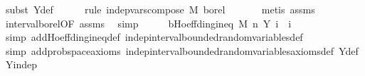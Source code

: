 \begin{isabellebody}
\ {\isacharparenleft}{\kern0pt}subst\ Y{\isacharunderscore}{\kern0pt}def{\isacharparenright}{\kern0pt}\isanewline
\ \ \ \ \isamarkupfalse%
\ {\isacharparenleft}{\kern0pt}rule\ indep{\isacharunderscore}{\kern0pt}vars{\isacharunderscore}{\kern0pt}compose{\isacharbrackleft}{\kern0pt}\ M{\isacharprime}{\kern0pt}{\isacharequal}{\kern0pt}{\isachardoublequoteopen}{\isacharparenleft}{\kern0pt}{\isasymlambda}{\isacharunderscore}{\kern0pt}{\isachardot}{\kern0pt}\ borel{\isacharparenright}{\kern0pt}{\isachardoublequoteclose}{\isacharbrackright}{\kern0pt}{\isacharparenright}{\kern0pt}\isanewline
\ \ \ \ \ \isamarkupfalse%
\ {\isacharparenleft}{\kern0pt}metis\ assms{\isacharparenleft}{\kern0pt}{}{\isacharparenright}{\kern0pt}{\isacharparenright}{\kern0pt}\isanewline
\ \ \ \ \isamarkupfalse%
\ interval{\isacharunderscore}{\kern0pt}borel{\isacharbrackleft}{\kern0pt}OF\ assms{\isacharparenleft}{\kern0pt}{}{\isacharparenright}{\kern0pt}{\isacharbrackright}{\kern0pt}\ \isamarkupfalse%
\ simp\isanewline
\ \isanewline
\ \ \isamarkupfalse%
\ b{\isacharcolon}{\kern0pt}{\isachardoublequoteopen}Hoeffding{\isacharunderscore}{\kern0pt}ineq\ M\ {\isacharbraceleft}{\kern0pt}{}{\isachardot}{\kern0pt}{\isachardot}{\kern0pt}{\isacharless}{\kern0pt}n{\isacharbraceright}{\kern0pt}\ Y\ {\isacharparenleft}{\kern0pt}{\isasymlambda}i{\isachardot}{\kern0pt}\ {}{\isacharparenright}{\kern0pt}\ {\isacharparenleft}{\kern0pt}{\isasymlambda}i{\isachardot}{\kern0pt}\ {}{\isacharparenright}{\kern0pt}{\isachardoublequoteclose}\ \isanewline
\ \ \ \ \isamarkupfalse%
\ {\isacharparenleft}{\kern0pt}simp\ add{\isacharcolon}{\kern0pt}Hoeffding{\isacharunderscore}{\kern0pt}ineq{\isacharunderscore}{\kern0pt}def\ indep{\isacharunderscore}{\kern0pt}interval{\isacharunderscore}{\kern0pt}bounded{\isacharunderscore}{\kern0pt}random{\isacharunderscore}{\kern0pt}variables{\isacharunderscore}{\kern0pt}def{\isacharparenright}{\kern0pt}\isanewline
\ \ \ \ \isamarkupfalse%
\ {\isacharparenleft}{\kern0pt}simp\ add{\isacharcolon}{\kern0pt}prob{\isacharunderscore}{\kern0pt}space{\isacharunderscore}{\kern0pt}axioms\ indep{\isacharunderscore}{\kern0pt}interval{\isacharunderscore}{\kern0pt}bounded{\isacharunderscore}{\kern0pt}random{\isacharunderscore}{\kern0pt}variables{\isacharunderscore}{\kern0pt}axioms{\isacharunderscore}{\kern0pt}def\ Y{\isacharunderscore}{\kern0pt}def\ Y{\isacharunderscore}{\kern0pt}indep{\isacharparenright}{\kern0pt}\isanewline

\end{isabellebody}
